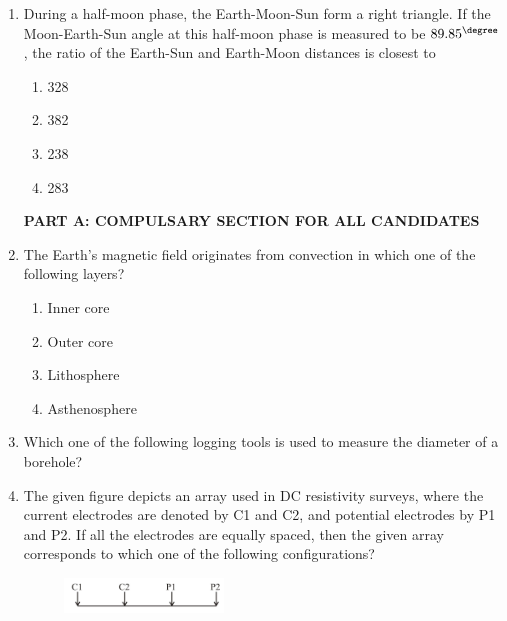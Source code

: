 \documentclass[journal,12pt,onecolumn]{IEEEtran}
\begin{document}
\begin{enumerate}
\hfill{}

\begin{multicols}{4}
\begin{enumerate}
    \item 0
    \item 1
    \item 2
    \item 3
\end{enumerate}
\end{multicols}

\item During a half-moon phase, the Earth-Moon-Sun form a right triangle. If the Moon-Earth-Sun angle at this half-moon phase is measured to be $89.85^{\degree}$, the ratio of the Earth-Sun and Earth-Moon distances is closest to

\hfill{}

\begin{multicols}{4}
\begin{enumerate}
    \item 328
    \item 382
    \item 238
    \item 283
\end{enumerate}
\end{multicols}

\textbf{PART A: COMPULSARY SECTION FOR ALL CANDIDATES}




\item The Earth's magnetic field originates from convection in which one of the following layers?

\hfill{}

\begin{multicols}{2}
\begin{enumerate}
    \item Inner core
    \item Outer core
    \item Lithosphere
    \item Asthenosphere
\end{enumerate}
\end{multicols}

\item Which one of the following logging tools is used to measure the diameter of a borehole?

\hfill{}

\item The given figure depicts an array used in DC resistivity surveys, where the current electrodes are denoted by C1 and C2, and potential electrodes by P1 and P2. If all the electrodes are equally spaced, then the given array corresponds to which one of the following configurations?
\begin{figure}[h!]
    \centering
    \includegraphics[width=0.4\textwidth]{figs/fig3.png}
    \caption{}
    \label{fig:q18}
\end{figure}



\end{enumerate}
\end{document}
